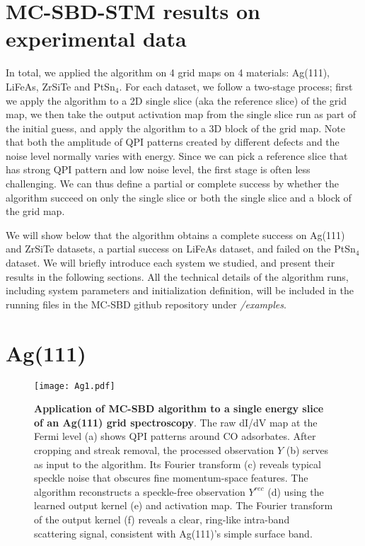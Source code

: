 \section{MC-SBD-STM results on experimental data}
In total, we applied the algorithm on 4 grid maps on 4 materials: Ag(111), LiFeAs, ZrSiTe and PtSn$_4$. For each dataset, we follow a two-stage process; first we apply the algorithm to a 2D single slice (aka the reference slice) of the grid map, we then take the output activation map from the single slice run as part of the initial guess, and apply the algorithm to a 3D block of the grid map. Note that both the amplitude of QPI patterns created by different defects and the noise level normally varies with energy. Since we can pick a reference slice that has strong QPI pattern and low noise level, the first stage is often less challenging. We can thus define a partial or complete success by whether the algorithm succeed on only the single slice or both the single slice and a block of the grid map. 

We will show below that the algorithm obtains a complete success on Ag(111) and ZrSiTe datasets, a partial success on LiFeAs dataset, and failed on the PtSn$_4$ dataset.  We will briefly introduce each system we studied, and present their results in the following sections. All the technical details of the algorithm runs, including system parameters and initialization definition, will be included in the running files in the MC-SBD github repository under \textit{\slash examples}. 

\section{Ag(111)}

\begin{figure}
	\texttt{[image: Ag1.pdf]} 
	\centering
	\caption[\textbf{Application of MC-SBD algorithm to a single energy slice of an Ag(111) grid spectroscopy}]{\textbf{Application of MC-SBD algorithm to a single energy slice of an Ag(111) grid spectroscopy}. The raw dI/dV map at the Fermi level (a) shows QPI patterns around CO adsorbates. After cropping and streak removal, the processed observation $Y$ (b) serves as input to the algorithm. Its Fourier transform (c) reveals typical speckle noise that obscures fine momentum-space features. The algorithm reconstructs a speckle-free observation $Y^{rec}$ (d) using the learned output kernel (e) and activation map. The Fourier transform of the output kernel (f) reveals a clear, ring-like intra-band scattering signal, consistent with Ag(111)’s simple surface band. }
	\label{fig:Ag1}
\end{figure}

